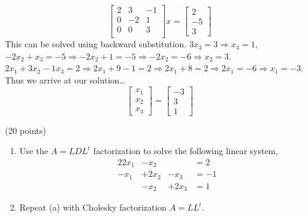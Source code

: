 \documentclass[10pt]{jhwhw}
\begin{document}
	$$
	\begin{bmatrix}
		2 & 3 & -1 \\
		0 & -2 & 1 \\
		0 & 0 & 3 \\
	\end{bmatrix}x = 
	\begin{bmatrix}
		2 \\ -5 \\ 3
	\end{bmatrix}
	$$
	This can be solved using backward substitution. $3x_3 = 3 \Rightarrow x_3 = 1$,
	$-2x_2 + x_3 = -5 \Rightarrow -2x_2 + 1 = -5 \Rightarrow -2x_2 = -6 \Rightarrow x_2 = 3$.
	$2x_1 + 3x_2 -1x_3 = 2 \Rightarrow 2x_1 + 9 - 1 = 2 \Rightarrow 2x_1 + 8 = 2 \Rightarrow
	2x_1 = -6 \Rightarrow x_1 = -3$.
	Thus we arrive at our solution\ldots
	$$
	\begin{bmatrix}
		x_1 \\ x_2 \\ x_3
	\end{bmatrix} = 
	\begin{bmatrix}
		-3 \\ 3 \\ 1
	\end{bmatrix}
	$$


\problem{} (20 points)

	\begin{enumerate}
		\item Use the $A = LDL^t$ factorization to solve the following linear system,
			\begin{alignat*}{2}
				2x_1 &- x_2 & &= 2 \\
				-x_1 &+ 2x_2 &- x_3 &= -1 \\
				&- x_2 &+ 2x_3 &= 1
			\end{alignat*}
		\item Repeat (a) with Cholesky factorization $A = LL^t$.
	\end{enumerate}

\solution
\end{document}
